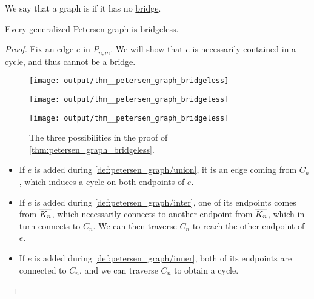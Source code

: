 \begin{definition}\label{def:bridgeless_graph}\mimprovised
  We say that a graph is  if it has no \hyperref[def:graph_bridge]{bridge}.
\end{definition}

\begin{proposition}\label{thm:petersen_graph_bridgeless}
  Every \hyperref[def:petersen_graph]{generalized Petersen graph} is \hyperref[def:bridgeless_graph]{bridgeless}.
\end{proposition}
\begin{proof}
  Fix an edge \( e \) in \( P_{n,m} \). We will show that \( e \) is necessarily contained in a cycle, and thus cannot be a bridge.

  \begin{figure}[!ht]
    \begin{subcaptionblock}{0.3\textwidth}
      \centering
      \texttt{[image: output/thm\_\_petersen\_graph\_bridgeless]}
    \end{subcaptionblock}
    \hfill
    \begin{subcaptionblock}{0.3\textwidth}
      \centering
      \texttt{[image: output/thm\_\_petersen\_graph\_bridgeless]}
    \end{subcaptionblock}
    \hfill
    \begin{subcaptionblock}{0.3\textwidth}
      \centering
      \texttt{[image: output/thm\_\_petersen\_graph\_bridgeless]}
    \end{subcaptionblock}
    \caption{The three possibilities in the proof of \cref{thm:petersen_graph_bridgeless}.}\label{fig:thm:petersen_graph_bridgeless/proof}
  \end{figure}

  \begin{itemize}
    \item If \( e \) is added during \cref{def:petersen_graph/union}, it is an edge coming from \( C_n \), which induces a cycle on both endpoints of \( e \).

    \item If \( e \) is added during \cref{def:petersen_graph/inter}, one of its endpoints comes from \( \oline{K_n} \), which necessarily connects to another endpoint from \( \oline{K_n} \), which in turn connects to \( C_n \). We can then traverse \( C_n \) to reach the other endpoint of \( e \).

    \item If \( e \) is added during \cref{def:petersen_graph/inner}, both of its endpoints are connected to \( C_n \), and we can traverse \( C_n \) to obtain a cycle.
  \end{itemize}
\end{proof}

